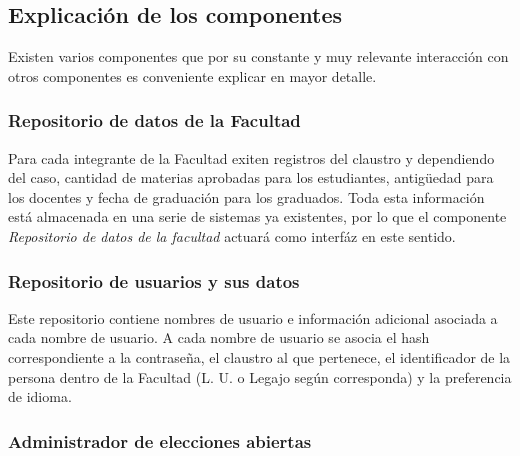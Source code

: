 




\subsection{Explicación de los componentes}
\label{explicaciones}
Existen varios componentes que por su constante y muy relevante interacción con otros componentes es conveniente explicar en mayor detalle.


\subsubsection{Repositorio de datos de la Facultad}
Para cada integrante de la Facultad exiten registros del claustro y dependiendo del caso, cantidad de materias aprobadas para los estudiantes, antigüedad para los docentes y fecha de graduación para los graduados. Toda esta información está almacenada en una serie de sistemas ya existentes, por lo que el componente \emph{Repositorio de datos de la facultad} actuará como interfáz en este sentido.


\subsubsection{Repositorio de usuarios y sus datos}


Este repositorio contiene nombres de usuario e información adicional asociada a cada nombre de usuario. A cada nombre de usuario se asocia el hash correspondiente a la contraseña, el claustro al que pertenece, el identificador de la persona dentro de la Facultad (L. U. o Legajo según corresponda) y la preferencia de idioma. 


\subsubsection{Administrador de elecciones abiertas}

\label{admin_elecciones}

